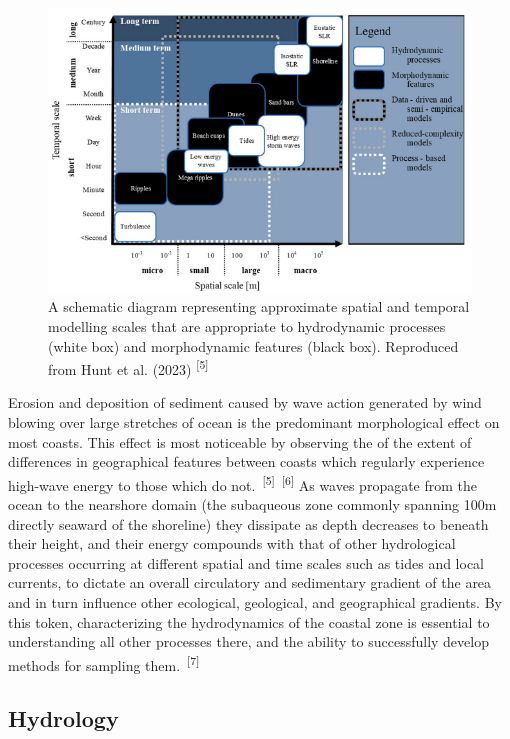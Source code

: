 \documentclass{article}
\begin{document}
\begin{figure}
    \centering
    \includegraphics[width=0.8\linewidth]{images/spatial-and-temporal.png}
    \caption{A schematic diagram representing approximate spatial and temporal modelling scales that are appropriate to hydrodynamic processes (white box) and morphodynamic features (black box). Reproduced from Hunt et al. (2023) \textsuperscript{[5]}}
    \label{figure1}
\end{figure}

{Erosion and deposition of sediment caused by wave action generated by wind blowing over large stretches of ocean is the predominant morphological effect on most coasts. This effect is most noticeable by observing the of the extent of differences in geographical features between coasts which regularly experience high-wave energy to those which do not.~\textsuperscript{[5]}~\textsuperscript{[6]} As waves propagate from the ocean to the nearshore domain (the subaqueous zone commonly spanning 100m directly seaward of the shoreline) they dissipate as depth decreases to beneath their height, and their energy compounds with that of other hydrological processes occurring at different spatial and time scales such as tides and local currents, to dictate an overall circulatory and sedimentary gradient of the area and in turn influence other ecological, geological, and geographical gradients. By this token, characterizing the hydrodynamics of the coastal zone is essential to understanding all other processes there, and the ability to successfully develop methods for sampling them.~\textsuperscript{[7]} \par}

\newpage
{}
\fancyfoot[C]{\thepage} 
\thispagestyle{fancy}
\subsection{Hydrology}
\end{document}
